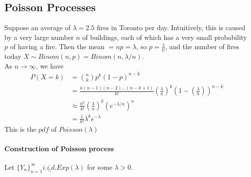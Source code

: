 \documentclass[11pt]{article}
\begin{document}
   	\subsection{Poisson Processes}
   	\example
   	Suppose an average of $\lambda = 2.5$ fires in Toronto per day. Intuitively, this is caused by a very large number $n$ of buildings, each of which has a very small probability $p$ of having a fire. Then the mean $= np = \lambda$, so $p = \frac{\lambda}{n}$, and the number of fires today $X \sim Binom(n,p) = Binom(n, \lambda/n)$.\\
   	As $n \rightarrow \infty$, we have
   	\begin{align*}
   		P(X = k) &= {n \choose k}p^k(1-p)^{n-k} \\
   		&= \frac{n(n-1)(n-2)\hdots(n-k+1)}{k!}\left(\frac{\lambda}{n}\right)^k\left(1-\left(\frac{\lambda}{n}\right)\right)^{n-k}\\
   		&\approx \frac{n^k}{k!}\left(\frac{\lambda}{n}\right)^k \left(e^{-\lambda/n}\right)^n\\
   		&= \frac{1}{k!}\lambda^k e^{-\lambda}
   	\end{align*}
   	This is the $pdf$ of $Poisson(\lambda)$
   	\paragraph{Construction of Poisson process}
   	Let $\{Y_n\}_{n=1}^\infty \underset{\sim}{i.i.d.} Exp(\lambda)$ for some $\lambda > 0$.
   	
    
    
    
    
    
    
    
    
    
    
    
    
    
    
    
    
    
    
    
    
\end{document}
